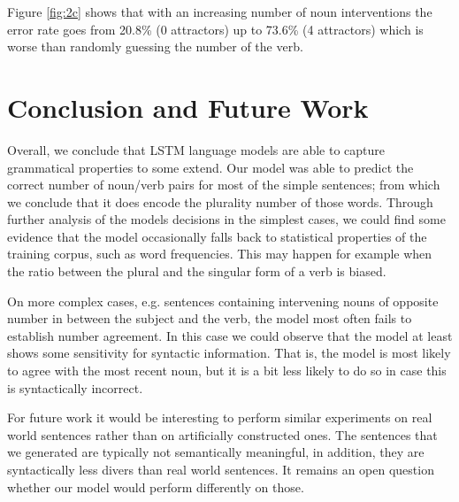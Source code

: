 \documentclass[11pt,a4paper]{article}
\begin{document}
Figure \ref{fig:2c} shows that with an increasing number of noun interventions the error rate goes from 20.8\% (0 attractors) up to 73.6\% (4 attractors) which is worse than randomly guessing the number of the verb. 






\section{Conclusion and Future Work}
\label{conclusion}


Overall, we conclude that LSTM language models
are able to capture grammatical properties to some extend.
Our model was able to predict the correct number of noun/verb pairs 
for most of the simple sentences;
from which we conclude that it does encode the plurality number of those words. 
Through further analysis of the models decisions in the simplest cases, we could find some evidence that the model occasionally falls back to statistical properties of the training corpus, such as word frequencies.
This may happen for example when the ratio between the plural 
and the singular form of a verb is biased.

On more complex cases, e.g. sentences containing intervening nouns 
of opposite number
in between the subject and the verb, 
the model most often fails to establish number agreement. 
In this case we could observe that the model at least shows 
some sensitivity for syntactic information.
That is, the model is most likely to agree with the
most recent noun, but it is a bit less likely to do so 
in case this is syntactically incorrect.

For future work it would be interesting to perform similar experiments on real world sentences rather than on artificially constructed ones. 
The sentences that we generated are typically not semantically meaningful,
in addition, they are syntactically less divers than real world sentences. 
It remains an open question whether our model would perform differently on those.
\end{document}
